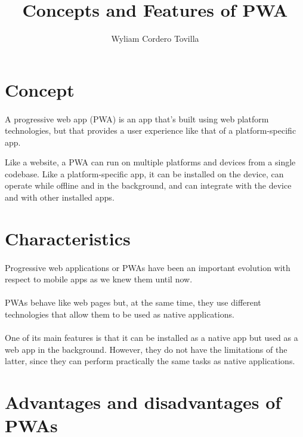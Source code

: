 \documentclass[]{article}
\title{Concepts and Features of PWA}
\author{Wyliam Cordero Tovilla}
\begin{document}
	
	\maketitle
	
	\section{Concept}
	\paragraph{\space}{
		A progressive web app (PWA) is an app that's built using web platform technologies, but that provides a user experience like that of a platform-specific app.
		
		Like a website, a PWA can run on multiple platforms and devices from a single codebase. Like a platform-specific app, it can be installed on the device, can operate while offline and in the background, and can integrate with the device and with other installed apps.
	}
	
	\section{Characteristics}
	\paragraph{\space}{
		Progressive web applications or PWAs have been an important evolution with respect to mobile apps as we knew them until now.
	}
	
	\paragraph{}{
		PWAs behave like web pages but, at the same time, they use different technologies that allow them to be used as native applications.
	}
	
	\paragraph{}{
		One of its main features is that it can be installed as a native app but used as a web app in the background. However, they do not have the limitations of the latter, since they can perform practically the same tasks as native applications.
	}
	
	
	
	\section{Advantages and disadvantages of PWAs}
	
\end{document}
